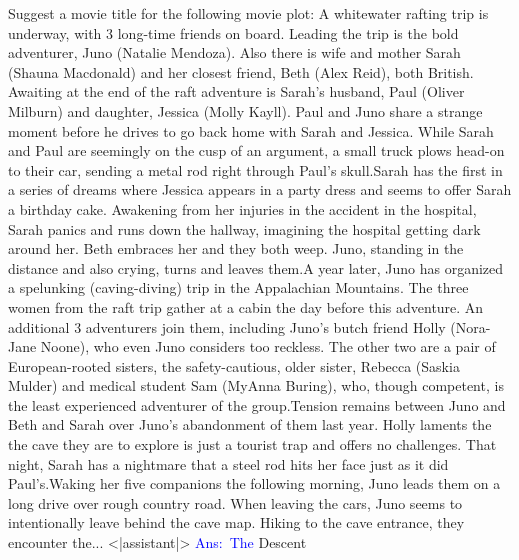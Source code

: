\documentclass{article}
\begin{document}
\begin{tcolorbox}[colframe=black,colback=white]
Suggest a movie title for the following movie plot: A whitewater rafting trip is underway, with 3 long-time friends on board. Leading the trip is the bold adventurer, Juno (Natalie Mendoza). Also there is wife and mother Sarah (Shauna Macdonald) and her closest friend, Beth (Alex Reid), both British. Awaiting at the end of the raft adventure is Sarah's husband, Paul (Oliver Milburn) and daughter, Jessica (Molly Kayll). Paul and Juno share a strange moment before he drives to go back home with Sarah and Jessica. While Sarah and Paul are seemingly on the cusp of an argument, a small truck plows head-on to their car, sending a metal rod right through Paul's skull.Sarah has the first in a series of dreams where Jessica appears in a party dress and seems to offer Sarah a birthday cake. Awakening from her injuries in the accident in the hospital, Sarah panics and runs down the hallway, imagining the hospital getting dark around her. Beth embraces her and they both weep. Juno, standing in the distance and also crying, turns and leaves them.A year later, Juno has organized a spelunking (caving-diving) trip in the Appalachian Mountains. The three women from the raft trip gather at a cabin the day before this adventure. An additional 3 adventurers join them, including Juno's butch friend Holly (Nora-Jane Noone), who even Juno considers too reckless. The other two are a pair of European-rooted sisters, the safety-cautious, older sister, Rebecca (Saskia Mulder) and medical student Sam (MyAnna Buring), who, though competent, is the least experienced adventurer of the group.Tension remains between Juno and Beth and Sarah over Juno's abandonment of them last year. Holly laments the the cave they are to explore is just a tourist trap and offers no challenges. That night, Sarah has a nightmare that a steel rod hits her face just as it did Paul's.Waking her five companions the following morning, Juno leads them on a long drive over rough country road. When leaving the cars, Juno seems to intentionally leave behind the cave map. Hiking to the cave entrance, they encounter the...
<|assistant|>
\textcolor{blue}{Ans}\textcolor{blue}{:}\textcolor{blue}{~The} Descent\textcolor{blue}{}
\end{tcolorbox}
\end{document}
